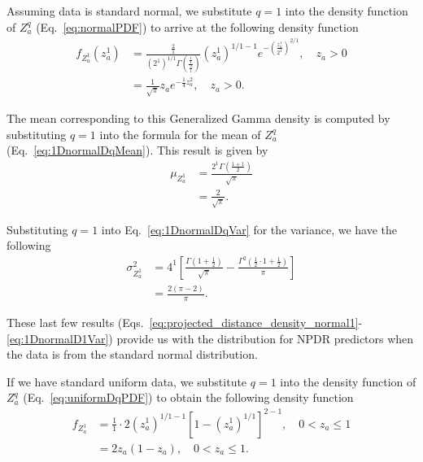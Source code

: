 \documentclass[aoas]{imsart}
\begin{document}
Assuming data is standard normal, we substitute $q=1$ into the density function of $Z^q_a$ (Eq.~\ref{eq:normalPDF}) to arrive at the following density function
%
\begin{equation}\label{eq:projected_distance_density_normal1}
\begin{aligned}
f_{Z^1_a}\left(z^1_a\right) &= \frac{\frac{2}{1}}{\left(2^1\right)^{1/1}\Gamma\left(\frac{\frac{1}{1}}{\frac{2}{1}}\right)}\left(z^1_a\right)^{1/1 - 1} e^{-\left(\frac{z^1_a}{2^1}\right)^{2/1}}, \quad z_a > 0\\
&= \frac{1}{\sqrt{\pi}} z_a e^{-\frac{1}{4}z^2_a}, \quad z_a > 0.
\end{aligned}
\end{equation}

The mean corresponding to this Generalized Gamma density is computed by substituting $q=1$ into the formula for the mean of $Z^q_a$ (Eq.~\ref{eq:1DnormalDqMean}). This result is given by
%
\begin{equation}\label{eq:1DnormalD1Mean}
\begin{aligned}
\mu_{Z^1_a} &= \frac{2^1 \Gamma\left(\frac{1 + 1}{2}\right)}{\sqrt{\pi}} \\
&= \frac{2}{\sqrt{\pi}}.
\end{aligned}
\end{equation}

Substituting $q=1$ into Eq.~\ref{eq:1DnormalDqVar} for the variance, we have the following
%
\begin{equation}\label{eq:1DnormalD1Var}
\begin{aligned}
\sigma^2_{Z^1_a} &= 4^1\left[\frac{\Gamma\left(1 + \frac{1}{2}\right)}{\sqrt{\pi}} - \frac{\Gamma^2\left(\frac{1}{2}\cdot 1 + \frac{1}{2}\right)}{\pi}\right] \\
&= \frac{2(\pi-2)}{\pi}.
\end{aligned}
\end{equation}

These last few results (Eqs.~\ref{eq:projected_distance_density_normal1}-\ref{eq:1DnormalD1Var}) provide us with the distribution for NPDR predictors when the data is from the standard normal distribution. 

If we have standard uniform data, we substitute $q=1$ into the density function of $Z^q_a$ (Eq.~\ref{eq:uniformDqPDF}) to obtain the following density function
%
\begin{equation}\label{eq:projected_distance_density_uniform1}
\begin{aligned}
f_{Z^1_a} &= \frac{1}{1}\cdot 2\left(z^1_a\right)^{1/1 - 1}\left[1 - \left(z^1_a\right)^{1/1}\right]^{2-1}, \quad 0 < z_a \leq 1 \\
&= 2z_a(1 - z_a), \quad 0 < z_a \leq 1.
\end{aligned}
\end{equation}
\end{document}

